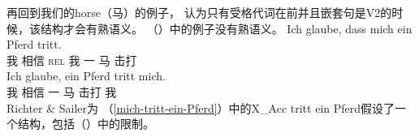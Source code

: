 再回到我们的horse（马）的例子， \citet[]{RS2009a}认为只有受格代词在前并且嵌套句是V2的时候，该结构才会有熟语义。 （）中的例子没有熟语义。
\eal
\ex 
\gll Ich glaube, dass mich ein Pferd tritt.\\
     我 相信   \textsc{rel} 我   一 马   击打\\
\ex 
\gll Ich glaube, ein Pferd tritt mich.\\
    我 相信   一 马   击打 我\\
\zl
Richter \& Sailer为 （\ref{mich-tritt-ein-Pferd}）中的X\_Acc tritt ein Pferd假设了一个结构，包括（）中的限制。

